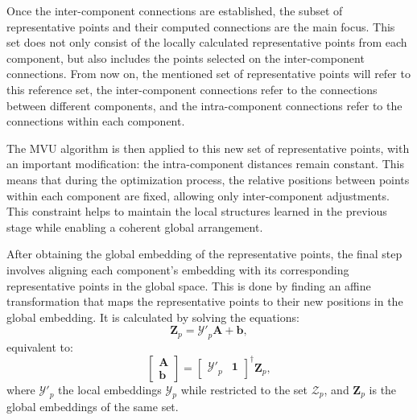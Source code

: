         Once the inter-component connections are established, the subset of representative points and their computed connections are the main focus. This set does not only consist of the locally calculated representative points from each component, but also includes the points selected on the inter-component connections. From now on, the mentioned set of representative points will refer to this reference set, the inter-component connections refer to the connections between different components, and the intra-component connections refer to the connections within each component.

        The \ac{MVU} algorithm is then applied to this new set of representative points, with an important modification: the intra-component distances remain constant. This means that during the optimization process, the relative positions between points within each component are fixed, allowing only inter-component adjustments. This constraint helps to maintain the local structures learned in the previous stage while enabling a coherent global arrangement.

        After obtaining the global embedding of the representative points, the final step involves aligning each component's embedding with its corresponding representative points in the global space. This is done by finding an affine transformation that maps the representative points to their new positions in the global embedding. It is calculated by solving the equations:
        \begin{equation}
            \boldsymbol{Z}_p = \boldsymbol{{\mathcal{Y'}}}_p \boldsymbol{A} + \boldsymbol{b},
        \end{equation}
        equivalent to:
        \begin{equation}
            \begin{bmatrix}
                \boldsymbol{A} \\
                \boldsymbol{b}
            \end{bmatrix}
            = \begin{bmatrix}
                \boldsymbol{{\mathcal{Y'}}}_p & \boldsymbol{1}
            \end{bmatrix}^\dag \boldsymbol{Z}_p,
        \end{equation}
        where $\boldsymbol{{\mathcal{Y'}}}_p$ the local embeddings $\boldsymbol{{\mathcal{Y}}}_p$ while restricted to the set $\boldsymbol{{\mathcal{Z}}}_p$, and $\boldsymbol{Z}_p$ is the global embeddings of the same set.

